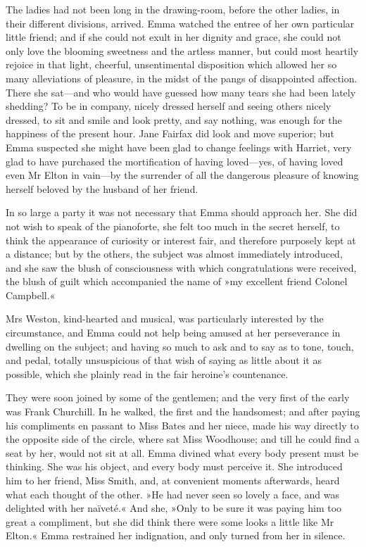 The ladies had not been long in the drawing-room, before the other ladies, in their different divisions, arrived. Emma watched the entree of her own particular little friend; and if she could not exult in her dignity and grace, she could not only love the blooming sweetness and the artless manner, but could most heartily rejoice in that light, cheerful, unsentimental disposition which allowed her so many alleviations of pleasure, in the midst of the pangs of disappointed affection. There she sat—and who would have guessed how many tears she had been lately shedding? To be in company, nicely dressed herself and seeing others nicely dressed, to sit and smile and look pretty, and say nothing, was enough for the happiness of the present hour. Jane Fairfax did look and move superior; but Emma suspected she might have been glad to change feelings with Harriet, very glad to have purchased the mortification of having loved—yes, of having loved even Mr Elton in vain—by the surrender of all the dangerous pleasure of knowing herself beloved by the husband of her friend.

In so large a party it was not necessary that Emma should approach her. She did not wish to speak of the pianoforte, she felt too much in the secret herself, to think the appearance of curiosity or interest fair, and therefore purposely kept at a distance; but by the others, the subject was almost immediately introduced, and she saw the blush of consciousness with which congratulations were received, the blush of guilt which accompanied the name of »my excellent friend Colonel Campbell.«

Mrs Weston, kind-hearted and musical, was particularly interested by the circumstance, and Emma could not help being amused at her perseverance in dwelling on the subject; and having so much to ask and to say as to tone, touch, and pedal, totally unsuspicious of that wish of saying as little about it as possible, which she plainly read in the fair heroine's countenance.

They were soon joined by some of the gentlemen; and the very first of the early was Frank Churchill. In he walked, the first and the handsomest; and after paying his compliments en passant to Miss Bates and her niece, made his way directly to the opposite side of the circle, where sat Miss Woodhouse; and till he could find a seat by her, would not sit at all. Emma divined what every body present must be thinking. She was his object, and every body must perceive it. She introduced him to her friend, Miss Smith, and, at convenient moments afterwards, heard what each thought of the other. »He had never seen so lovely a face, and was delighted with her naïveté.« And she, »Only to be sure it was paying him too great a compliment, but she did think there were some looks a little like Mr Elton.« Emma restrained her indignation, and only turned from her in silence.


